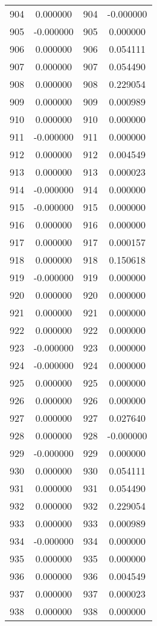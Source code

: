 \documentclass[12pt]{article}
\begin{document}
\begin{longtable}{@{}cccc@{}}
904 & 0.000000 & 904 & -0.000000 \\
905 & -0.000000 & 905 & 0.000000 \\
906 & 0.000000 & 906 & 0.054111 \\
907 & 0.000000 & 907 & 0.054490 \\
908 & 0.000000 & 908 & 0.229054 \\
909 & 0.000000 & 909 & 0.000989 \\
910 & 0.000000 & 910 & 0.000000 \\
911 & -0.000000 & 911 & 0.000000 \\
912 & 0.000000 & 912 & 0.004549 \\
913 & 0.000000 & 913 & 0.000023 \\
914 & -0.000000 & 914 & 0.000000 \\
915 & -0.000000 & 915 & 0.000000 \\
916 & 0.000000 & 916 & 0.000000 \\
917 & 0.000000 & 917 & 0.000157 \\
918 & 0.000000 & 918 & 0.150618 \\
919 & -0.000000 & 919 & 0.000000 \\
920 & 0.000000 & 920 & 0.000000 \\
921 & 0.000000 & 921 & 0.000000 \\
922 & 0.000000 & 922 & 0.000000 \\
923 & -0.000000 & 923 & 0.000000 \\
924 & -0.000000 & 924 & 0.000000 \\
925 & 0.000000 & 925 & 0.000000 \\
926 & 0.000000 & 926 & 0.000000 \\
927 & 0.000000 & 927 & 0.027640 \\
928 & 0.000000 & 928 & -0.000000 \\
929 & -0.000000 & 929 & 0.000000 \\
930 & 0.000000 & 930 & 0.054111 \\
931 & 0.000000 & 931 & 0.054490 \\
932 & 0.000000 & 932 & 0.229054 \\
933 & 0.000000 & 933 & 0.000989 \\
934 & -0.000000 & 934 & 0.000000 \\
935 & 0.000000 & 935 & 0.000000 \\
936 & 0.000000 & 936 & 0.004549 \\
937 & 0.000000 & 937 & 0.000023 \\
938 & 0.000000 & 938 & 0.000000 \\

\end{longtable}
\end{document}
